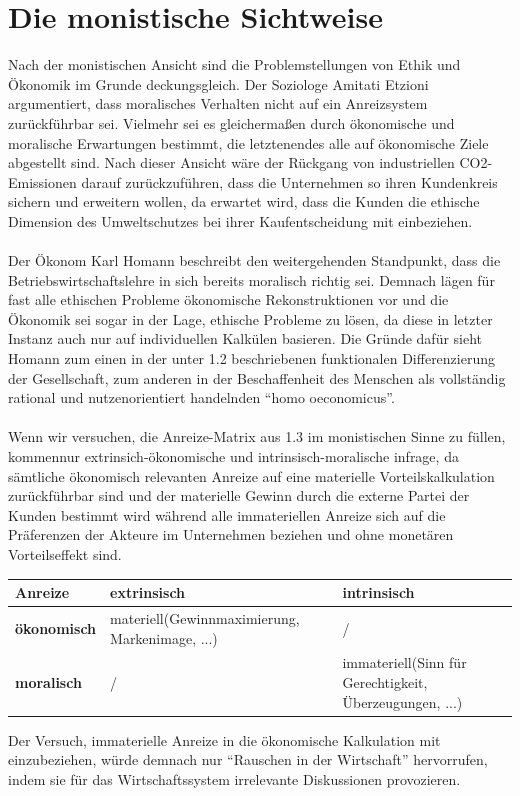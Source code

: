 \documentclass[12pt]{article}
\begin{document}
\section{Die monistische Sichtweise}
Nach der monistischen Ansicht sind die Problemstellungen von Ethik und Ökonomik im Grunde deckungsgleich. Der Soziologe Amitati Etzioni argumentiert, dass moralisches Verhalten nicht auf ein Anreizsystem zurückführbar sei. Vielmehr sei es gleichermaßen durch ökonomische und moralische Erwartungen bestimmt, die letztenendes alle auf ökonomische Ziele abgestellt sind. Nach dieser Ansicht wäre der Rückgang von industriellen CO2-Emissionen darauf zurückzuführen, dass die Unternehmen so ihren Kundenkreis sichern und erweitern wollen, da erwartet wird, dass die Kunden die ethische Dimension des Umweltschutzes bei ihrer Kaufentscheidung mit einbeziehen.\\
\\
Der Ökonom Karl Homann beschreibt den weitergehenden Standpunkt, dass die Betriebswirtschaftslehre in sich bereits moralisch richtig sei. Demnach lägen für fast alle ethischen Probleme ökonomische Rekonstruktionen vor und die Ökonomik sei sogar in der Lage, ethische Probleme zu lösen, da diese in letzter Instanz auch nur auf individuellen Kalkülen basieren. Die Gründe dafür sieht Homann zum einen in der unter 1.2 beschriebenen funktionalen Differenzierung der Gesellschaft, zum anderen in der Beschaffenheit des Menschen als vollständig rational und nutzenorientiert handelnden “homo oeconomicus”.\\
\\
Wenn wir versuchen, die Anreize-Matrix aus 1.3 im monistischen Sinne zu füllen, kommennur extrinsich-ökonomische und intrinsisch-moralische infrage, da sämtliche ökonomisch relevanten Anreize auf eine materielle Vorteilskalkulation zurückführbar sind und der materielle Gewinn durch die externe Partei der Kunden bestimmt wird während alle immateriellen Anreize sich auf die Präferenzen der Akteure im Unternehmen beziehen und ohne monetären Vorteilseffekt sind.
\begin{center}
\begin{tabular}{|p{3cm}|p{5cm}|p{5cm}|}
\hline
Anreize & \textbf{extrinsisch} & \textbf{intrinsisch}\\\hline
\textbf{ökonomisch} & materiell\newline(Gewinnmaximierung, Markenimage, ...) & /\\\hline
\textbf{moralisch} & / & immateriell\newline(Sinn für Gerechtigkeit, Überzeugungen, ...)\\\hline
\end{tabular}
\end{center}
Der Versuch, immaterielle Anreize in die ökonomische Kalkulation mit einzubeziehen, würde demnach nur “Rauschen in der Wirtschaft” hervorrufen, indem sie für das Wirtschaftssystem irrelevante Diskussionen provozieren.
\end{document}
